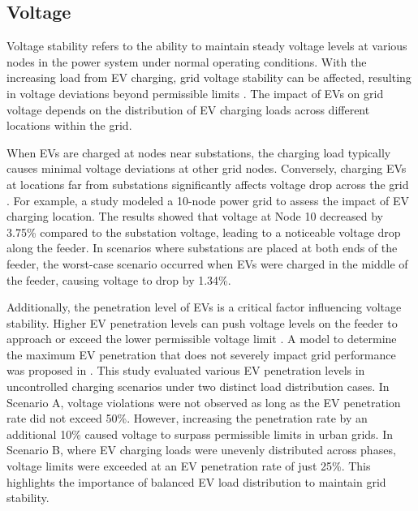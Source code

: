 \documentclass{thesis}
\begin{document}
\subsection{Voltage}
Voltage stability refers to the ability to maintain steady voltage levels at various nodes in the power system under normal operating conditions. With the increasing load from EV charging, grid voltage stability can be affected, resulting in voltage deviations beyond permissible limits \cite{53_greenin}. The impact of EVs on grid voltage depends on the distribution of EV charging loads across different locations within the grid.

When EVs are charged at nodes near substations, the charging load typically causes minimal voltage deviations at other grid nodes. Conversely, charging EVs at locations far from substations significantly affects voltage drop across the grid \cite{53_greenin}. For example, a study \cite{54_greenin} modeled a 10-node power grid to assess the impact of EV charging location. The results showed that voltage at Node 10 decreased by 3.75\% compared to the substation voltage, leading to a noticeable voltage drop along the feeder. In scenarios where substations are placed at both ends of the feeder, the worst-case scenario occurred when EVs were charged in the middle of the feeder, causing voltage to drop by 1.34\%.

Additionally, the penetration level of EVs is a critical factor influencing voltage stability. Higher EV penetration levels can push voltage levels on the feeder to approach or exceed the lower permissible voltage limit \cite{55_greenin}. A model to determine the maximum EV penetration that does not severely impact grid performance was proposed in \cite{56_greenin}. This study evaluated various EV penetration levels in uncontrolled charging scenarios under two distinct load distribution cases. In Scenario A, voltage violations were not observed as long as the EV penetration rate did not exceed 50\%. However, increasing the penetration rate by an additional 10\% caused voltage to surpass permissible limits in urban grids. In Scenario B, where EV charging loads were unevenly distributed across phases, voltage limits were exceeded at an EV penetration rate of just 25\%. This highlights the importance of balanced EV load distribution to maintain grid stability.
\end{document}

